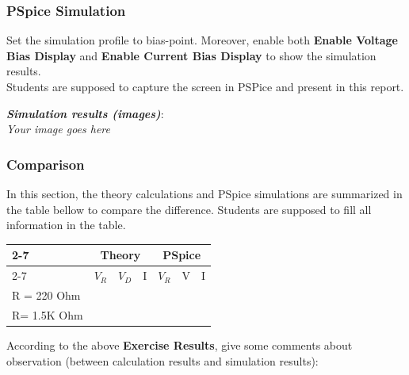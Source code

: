 \subsubsection{PSpice Simulation}
Set the simulation profile to bias-point. Moreover, enable both \textbf{Enable Voltage Bias Display} and \textbf{Enable Current Bias Display} to show the simulation results. \\

Students are supposed to capture the screen in PSPice and present in this report.

\textit{\textbf{Simulation results (images)}}:\\ \textit{Your image goes here}
\newpage

\subsubsection{Comparison}
In this section, the theory calculations and PSpice simulations are summarized in the table bellow to compare the difference. Students are supposed to fill all information in the table.
\begin{center}
    \begin{tabular}{l|l|l|l|l|l|l|}
    \cline{2-7}
                                      & \multicolumn{3}{c|}{\textbf{Theory}} & \multicolumn{3}{c|}{\textbf{PSpice}} \\ \cline{2-7} 
                                      & $V_R$              & $V_D$              & I              & $V_R$              & V              & I             \\ \hline
    \multicolumn{1}{|l|}{R = 220 Ohm} &                &                &                &                &                &               \\ \hline
    \multicolumn{1}{|l|}{R= 1.5K Ohm}  &                &                &                &                &                &               \\ \hline
    \end{tabular}
\end{center}


According to the above \textbf{Exercise Results}, give some comments about observation (between calculation results and simulation results):\dotfill\bigskip
\dotfill\bigskip\par\mbox{}\dotfill
\dotfill\bigskip\par\mbox{}\dotfill
\dotfill\bigskip\par\mbox{}\dotfill
\dotfill\bigskip\par\mbox{}\dotfill

